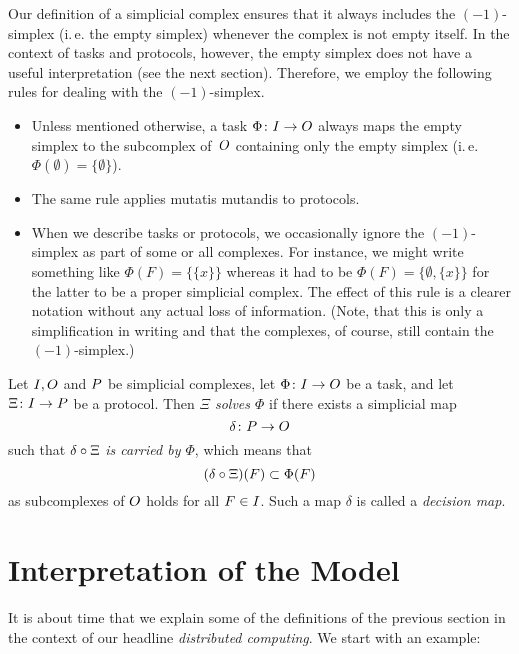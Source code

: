 \begin{thConvention}
    Our definition of a simplicial complex ensures that it always includes the
    $(-1)$-simplex (i.\,e. the empty simplex) whenever the complex is not empty
    itself. In the context of tasks and protocols, however, the empty simplex
    does not have a useful interpretation (see the next section). Therefore, we
    employ the following rules for dealing with the $(-1)$-simplex.
    \begin{itemize}
        \item
            Unless mentioned otherwise, a task $\Phi\colon I\to O$ always
            maps the empty simplex to the subcomplex of~$O$ containing only
            the empty simplex (i.\,e. $\Phi(\emptyset) = \{\emptyset\}$).
            
        \item
            The same rule applies mutatis mutandis to protocols.
            
        \item
            When we describe tasks or protocols, we occasionally ignore the
            $(-1)$-simplex as part of some or all complexes. For instance,
            we might write something like $\Phi(F) = \{\{x\}\}$ whereas
            it had to be $\Phi(F) = \{\emptyset,\{x\}\}$ for the
            latter to be a proper simplicial complex. The effect of
            this rule is a clearer notation without any actual loss
            of information. (Note, that this is only a simplification
            in writing and that the complexes, of course, still contain
            the $(-1)$-simplex.)
    \end{itemize}
\end{thConvention}

\begin{thDef}
    Let $I,O$ and $P$ be simplicial complexes,
    let $\Phi\colon I\to O$ be a task,
    and let $\Xi\colon I\to P$ be a protocol.
    Then \emph{$\Xi$ solves $\Phi$} if there exists a simplicial map
    \[ \delta\colon P\to O \] 
    such that $\delta\after\Xi$ \emph{is carried by $\Phi$},
    which means that
    \[ (\delta\after\Xi)(F) \subset \Phi(F) \]
    as subcomplexes of $O$ holds for all $F\in I$.
    Such a map $\delta$ is called a \emph{decision map}.
\end{thDef}

\section{Interpretation of the Model}
It is about time that we explain some of the definitions of the previous
section in the context of our headline \emph{distributed computing}.
We start with an example:

